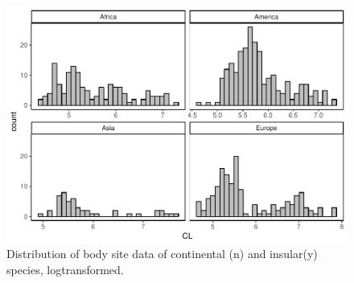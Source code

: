 \documentclass[]{article}
\begin{document}
\begin{figure}[htbp]
\centering
\includegraphics{MA_JJ_files/figure-latex/Histograms of body size data, split by continents-1.pdf}
\caption{Distribution of body site data of continental (n) and
insular(y) species, logtransformed.}
\end{figure}

\newpage
\end{document}
